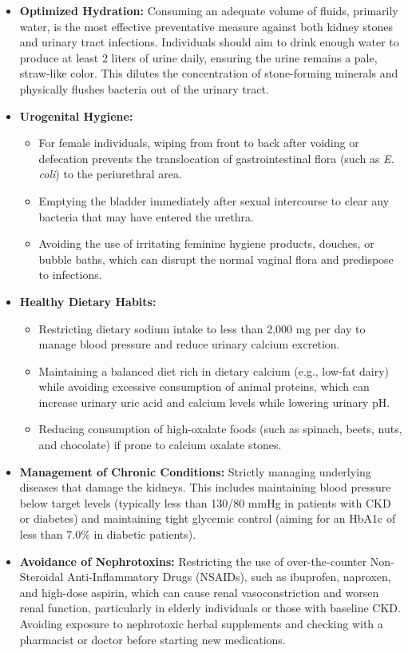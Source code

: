 \begin{itemize}
    \item \textbf{Optimized Hydration:} Consuming an adequate volume of fluids, primarily water, is the most effective preventative measure against both kidney stones and urinary tract infections. Individuals should aim to drink enough water to produce at least 2 liters of urine daily, ensuring the urine remains a pale, straw-like color. This dilutes the concentration of stone-forming minerals and physically flushes bacteria out of the urinary tract.
    \item \textbf{Urogenital Hygiene:}
    \begin{itemize}
        \item For female individuals, wiping from front to back after voiding or defecation prevents the translocation of gastrointestinal flora (such as \textit{E. coli}) to the periurethral area.
        \item Emptying the bladder immediately after sexual intercourse to clear any bacteria that may have entered the urethra.
        \item Avoiding the use of irritating feminine hygiene products, douches, or bubble baths, which can disrupt the normal vaginal flora and predispose to infections.
    \end{itemize}
    \item \textbf{Healthy Dietary Habits:}
    \begin{itemize}
        \item Restricting dietary sodium intake to less than 2,000 mg per day to manage blood pressure and reduce urinary calcium excretion.
        \item Maintaining a balanced diet rich in dietary calcium (e.g., low-fat dairy) while avoiding excessive consumption of animal proteins, which can increase urinary uric acid and calcium levels while lowering urinary pH.
        \item Reducing consumption of high-oxalate foods (such as spinach, beets, nuts, and chocolate) if prone to calcium oxalate stones.
    \end{itemize}
    \item \textbf{Management of Chronic Conditions:} Strictly managing underlying diseases that damage the kidneys. This includes maintaining blood pressure below target levels (typically less than 130/80 mmHg in patients with CKD or diabetes) and maintaining tight glycemic control (aiming for an HbA1c of less than 7.0\% in diabetic patients).
    \item \textbf{Avoidance of Nephrotoxins:} Restricting the use of over-the-counter Non-Steroidal Anti-Inflammatory Drugs (NSAIDs), such as ibuprofen, naproxen, and high-dose aspirin, which can cause renal vasoconstriction and worsen renal function, particularly in elderly individuals or those with baseline CKD. Avoiding exposure to nephrotoxic herbal supplements and checking with a pharmacist or doctor before starting new medications.

\end{itemize}
